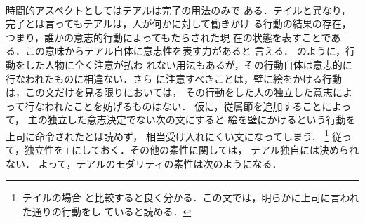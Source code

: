 \\時間的アスペクトとしてはテアルは完了の用法のみで
ある．テイルと異なり，完了とは言ってもテアルは，人が何かに対して働きかけ
る行動の結果の存在，つまり，誰かの意志的行動によってもたらされた現
在の状態を表すことである．この意味からテアル自体に意志性を表す力があると
言える．
のように，行動をした人物に全く注意が払わ
れない用法もあるが，その行動自体は意志的に行なわれたものに相違ない．さら
に注意すべきことは，壁に絵をかける行動は，この文だけを見る限りにおいては，
その行動をした人の独立した意志によって行なわれたことを妨げるものはない．
仮に，従属節を追加することによって，
{\dg 主}の独立した意志決定でない次の文にすると
絵を壁にかけるという行動を上司に命令されたとは読めず，
相当受け入れにくい文になってしまう．
\footnote{テイルの場合
と比較すると良く分かる．この文では，明らかに上司に言われた通りの行動をし
ていると読める．}
従って，独立性を$+$にしておく．その他の素性に関しては，
テアル独自には決められない．
よって，テアルのモダリティの素性は次のようになる．


